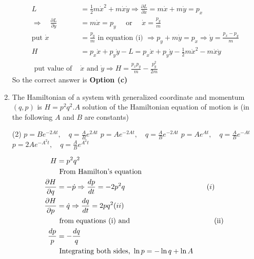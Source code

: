 \begin{enumerate}
\begin{tasks}
\end{tasks}
\begin{answer}
	$$
	\begin{aligned}
	L&=\frac{1}{2} m \dot{x}^{2}+m \dot{x} \dot{y} \Rightarrow \frac{\partial L}{\partial \dot{x}}=m \dot{x}+m \dot{y}=p_{x}\\
	\Rightarrow \quad \frac{\partial L}{\partial \dot{y}}&=m \dot{x}=p_{y} \quad \text { or } \quad \dot{x}=\frac{p_{y}}{m}\\
	\text{put }\dot{x}&=\frac{p_{y}}{m}\text{ in equation (i) }\Rightarrow p_{y}+m \dot{y}=p_{x} \Rightarrow \dot{y}=\frac{p_{x}-p_{y}}{m}\\
	H&=p_{x} \dot{x}+p_{y} \dot{y}-L=p_{x} \dot{x}+p_{y} \dot{y}-\frac{1}{2} m \dot{x}^{2}-m \dot{x} \dot{y}\\
	\text { put value of }& \dot{x} \text { and } \dot{y} \Rightarrow H=\frac{p_{x} p_{y}}{m}-\frac{p_{y}^{2}}{2 m}
\end{aligned}
$$
	So the correct answer is \textbf{Option (c)}
\end{answer}
\item The Hamiltonian of a system with generalized coordinate and momentum $(q, p)$ is $H=p^{2} q^{2} . A$ solution of the Hamiltonian equation of motion is (in the following $A$ and $B$ are constants)
{}
 \begin{tasks}(2)
	\task[\textbf{a.}]$p=B e^{-2 A t}, \quad q=\frac{A}{B} e^{2 A t}$
	\task[\textbf{b.}]$p=A e^{-2 A t}, \quad q=\frac{A}{B} e^{-2 A t}$
	\task[\textbf{c.}]$p=A e^{A t}, \quad q=\frac{A}{B} e^{-A t}$
	\task[\textbf{d.}]  $p=2 A e^{-A^{2} t}, \quad q=\frac{A}{B} e^{A^{2} t}$
\end{tasks}
\begin{answer}
	$$
	\begin{aligned}
	H&=p^{2} q^{2}\\
	&\text { From Hamilton's equation }\\
	\frac{\partial H}{\partial q}&=-\dot{p} \Rightarrow \frac{d p}{d t}=-2 p^{2} q \hspace{4cm}(i)\\
	\frac{\partial H}{\partial p}&=\dot{q} \Rightarrow \frac{d q}{d t}=2 p q^{2}(ii)\\
	&\text { from equations (i) and \hspace{4cm}(ii) }\\
	\frac{d p}{p}&=-\frac{d q}{q}\\
	&\text { Integrating both sides, } \ln p=-\ln q+\ln A\\

\end{aligned}$$
\end{answer}
\end{enumerate}
